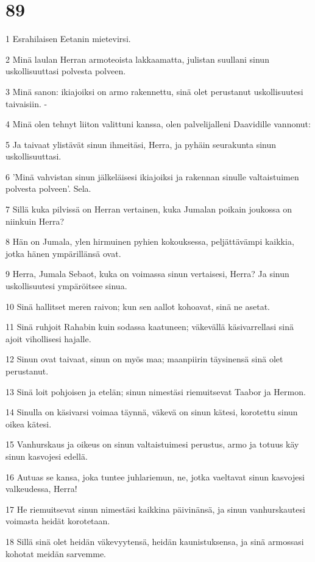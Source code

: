 \chapter{89}

\par 1 Esrahilaisen Eetanin mietevirsi.
\par 2 Minä laulan Herran armoteoista lakkaamatta, julistan suullani sinun uskollisuuttasi polvesta polveen.
\par 3 Minä sanon: ikiajoiksi on armo rakennettu, sinä olet perustanut uskollisuutesi taivaisiin. -
\par 4 Minä olen tehnyt liiton valittuni kanssa, olen palvelijalleni Daavidille vannonut:
\par 5 Ja taivaat ylistävät sinun ihmeitäsi, Herra, ja pyhäin seurakunta sinun uskollisuuttasi.
\par 6 'Minä vahvistan sinun jälkeläisesi ikiajoiksi ja rakennan sinulle valtaistuimen polvesta polveen'. Sela.
\par 7 Sillä kuka pilvissä on Herran vertainen, kuka Jumalan poikain joukossa on niinkuin Herra?
\par 8 Hän on Jumala, ylen hirmuinen pyhien kokouksessa, peljättävämpi kaikkia, jotka hänen ympärillänsä ovat.
\par 9 Herra, Jumala Sebaot, kuka on voimassa sinun vertaisesi, Herra? Ja sinun uskollisuutesi ympäröitsee sinua.
\par 10 Sinä hallitset meren raivon; kun sen aallot kohoavat, sinä ne asetat.
\par 11 Sinä ruhjoit Rahabin kuin sodassa kaatuneen; väkevällä käsivarrellasi sinä ajoit vihollisesi hajalle.
\par 12 Sinun ovat taivaat, sinun on myös maa; maanpiirin täysinensä sinä olet perustanut.
\par 13 Sinä loit pohjoisen ja etelän; sinun nimestäsi riemuitsevat Taabor ja Hermon.
\par 14 Sinulla on käsivarsi voimaa täynnä, väkevä on sinun kätesi, korotettu sinun oikea kätesi.
\par 15 Vanhurskaus ja oikeus on sinun valtaistuimesi perustus, armo ja totuus käy sinun kasvojesi edellä.
\par 16 Autuas se kansa, joka tuntee juhlariemun, ne, jotka vaeltavat sinun kasvojesi valkeudessa, Herra!
\par 17 He riemuitsevat sinun nimestäsi kaikkina päivinänsä, ja sinun vanhurskautesi voimasta heidät korotetaan.
\par 18 Sillä sinä olet heidän väkevyytensä, heidän kaunistuksensa, ja sinä armossasi kohotat meidän sarvemme.
